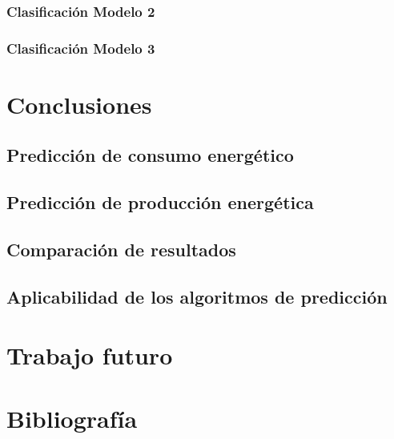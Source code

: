 \documentclass[a4paper,12pt]{article}
\begin{document}
\subsubsection{Clasificación Modelo 2}

\subsubsection{Clasificación Modelo 3}

\section{Conclusiones}

\subsection{Predicción de consumo energético}

\subsection{Predicción de producción energética}

\subsection{Comparación de resultados}

\subsection{Aplicabilidad de los algoritmos de predicción}

\section{Trabajo futuro}

\section*{Bibliografía}
\end{document}
